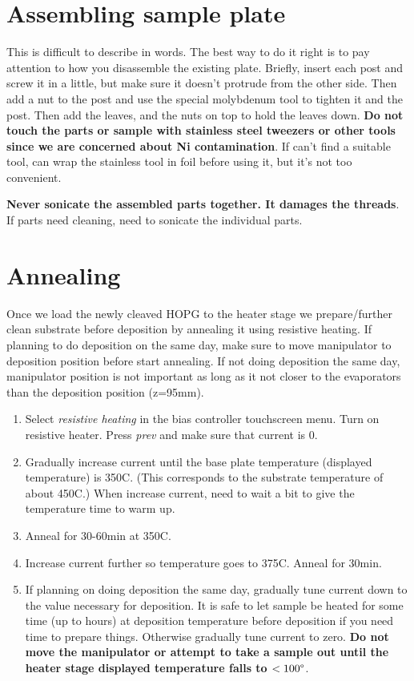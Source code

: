 \section{Assembling sample plate}
This is difficult to describe in words. The best way to do it right is to pay attention to  how you disassemble the existing plate. Briefly, insert each post and screw it in a little, but make sure it doesn't protrude from the other side. Then add a nut to the post and use the special molybdenum tool to tighten it and the post. Then add the leaves, and the nuts on top to hold the leaves down. \textbf{Do not touch the parts or sample with stainless steel tweezers or other tools since we are concerned about Ni contamination}. If can't find a suitable tool, can wrap the stainless tool in foil before using it, but it's not too convenient.  

\textbf{Never sonicate the assembled parts together. It damages the threads}. If parts need cleaning, need to sonicate the individual parts.
\section{Annealing}
Once we load the newly cleaved HOPG to the heater stage we prepare/further clean substrate before deposition by annealing it using resistive heating. If planning to do deposition on the same day, make sure to move manipulator to deposition position before start annealing. If not doing deposition the same day, manipulator position is not important as long as it not closer to the evaporators than the deposition position (z=95mm). 
\begin{enumerate}
\item Select \emph{resistive heating} in the bias controller touchscreen menu. Turn on resistive heater. Press \emph{prev} and make sure that current is 0. 
\item	Gradually increase current until the base plate temperature (displayed temperature) is 350C. (This corresponds to the substrate temperature of about 450C.) When increase current, need to wait a bit to give the temperature time to warm up. 
\item	Anneal for 30-60min at 350C.
\item	Increase current further so temperature goes to 375C. Anneal for 30min.
\item	If planning on doing deposition the same day, gradually tune current down to the value necessary for deposition. It is safe to let sample be heated for some time (up to hours) at deposition temperature before deposition if you need time to prepare things. Otherwise gradually tune current to zero. \textbf{Do not move the manipulator or attempt to take a sample out until the heater stage displayed temperature falls to $<100 \degree$}. 
\end{enumerate}